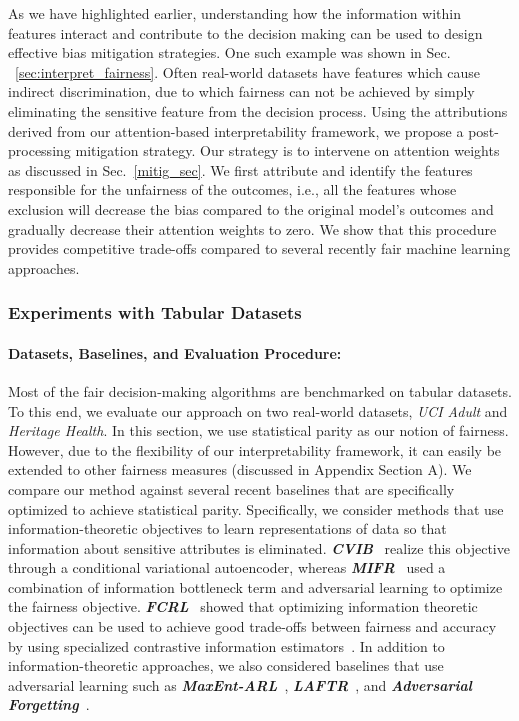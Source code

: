 As we have highlighted earlier, understanding how the information within features interact and contribute to the decision making can be used to design effective bias mitigation strategies. One such example was shown in Sec. ~\ref{sec:interpret_fairness}. Often real-world datasets have features which cause indirect discrimination, due to which fairness can not be achieved by simply eliminating the sensitive feature from the decision process. 
Using the attributions derived from our attention-based interpretability framework, we propose a post-processing mitigation strategy. Our strategy is to intervene on  attention weights as discussed in Sec.~\ref{mitig_sec}. We first attribute and identify the features responsible for the unfairness of the outcomes, i.e., all the features whose exclusion will decrease the bias compared to the original model's outcomes and gradually decrease their attention weights to zero. We show that this procedure provides competitive trade-offs compared to several recently fair machine learning approaches. 

\subsubsection{Experiments with Tabular Datasets}
\paragraph{Datasets, Baselines, and Evaluation Procedure:}
Most of the fair decision-making algorithms are benchmarked on tabular datasets. To this end, we evaluate our approach on two real-world datasets, \textit{UCI Adult} and \textit{Heritage Health}. In this section, we use statistical parity as our notion of fairness. However, due to the flexibility of our interpretability framework, it can  easily be extended to other fairness measures (discussed in Appendix Section A).  We compare our method against several recent baselines that are specifically optimized to achieve statistical parity. %
Specifically,  we consider methods that use information-theoretic objectives to learn representations of data so that information about sensitive attributes is eliminated.
\textit{\textbf{CVIB}}~\cite{NEURIPS2018_415185ea} realize this objective through a conditional variational autoencoder, whereas \textit{\textbf{MIFR}}~\cite{pmlr-v89-song19a} used a combination of information bottleneck term and adversarial learning to optimize the fairness objective. 
\textit{\textbf{FCRL}}~\cite{gupta2021controllable} showed that optimizing information theoretic objectives can be used to achieve good trade-offs between fairness and accuracy by using specialized contrastive information estimators~\cite{gupta2021controllable}. 
In addition to information-theoretic approaches, we also considered baselines that use adversarial learning such as \textit{\textbf{MaxEnt-ARL}}~\cite{roy2019mitigating}, \textit{\textbf{LAFTR}}~\cite{pmlr-v80-madras18a}, and \textit{\textbf{Adversarial Forgetting}}~\cite{advforg}. 

